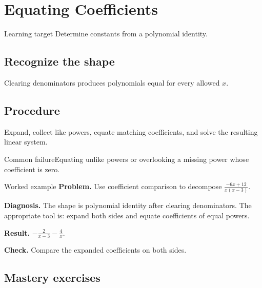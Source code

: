 \documentclass[11pt,oneside]{book}
\begin{document}
\chapter{Equating Coefficients}
\begin{rulebox}{Learning target}
Determine constants from a polynomial identity.
\end{rulebox}
\section{Recognize the shape}
Clearing denominators produces polynomials equal for every allowed $x$.
\section{Procedure}
Expand, collect like powers, equate matching coefficients, and solve the resulting linear system.

\begin{warningbox}{Common failure}Equating unlike powers or overlooking a missing power whose coefficient is zero.\end{warningbox}
\begin{examplebox}{Worked example}
\textbf{Problem.} Use coefficient comparison to decompose $\displaystyle \frac{- 6 x + 12}{x \left(x - 3\right)}$.

\textbf{Diagnosis.} The shape is polynomial identity after clearing denominators. The appropriate tool is: expand both sides and equate coefficients of equal powers.

\textbf{Result.} $\displaystyle - \frac{2}{x - 3} - \frac{4}{x}$.

\textbf{Check.} Compare the expanded coefficients on both sides.
\end{examplebox}
\section{Mastery exercises}
\end{document}
